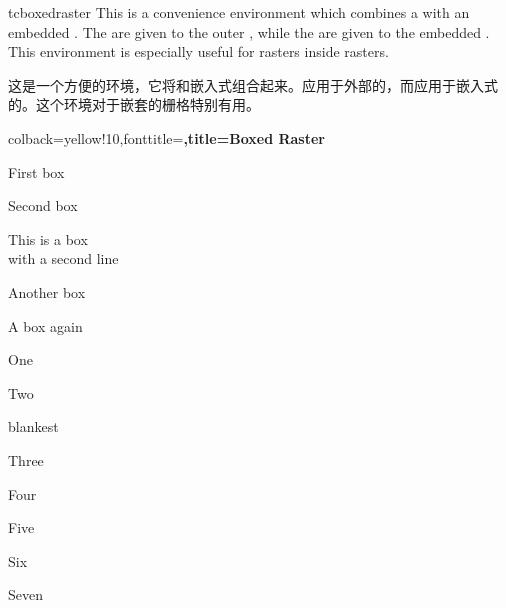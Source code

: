 \begin{docEnvironment}[doc new=2016-02-19]{tcboxedraster}{}
This is a convenience environment which combines a  with
an embedded . The  are given to the
outer , while the  are given to the
embedded .
This environment is especially useful for rasters inside rasters.

这是一个方便的环境，它将和嵌入式组合起来。应用于外部的，而应用于嵌入式的。这个环境对于嵌套的栅格特别有用。
\begin{dispExample}
\begin{tcboxedraster}[raster columns=3, raster equal height,
size=small,colframe=red!50!black,colback=red!10!white,colbacktitle=red!50!white,
title={Box \# \thetcbrasternum}]
{colback=yellow!10,fonttitle=\bfseries,title=Boxed Raster}
\begin{tcolorbox}First box\end{tcolorbox}
\begin{tcolorbox}Second box\end{tcolorbox}
\begin{tcolorbox}This is a box\\with a second line\end{tcolorbox}
\begin{tcolorbox}Another box\end{tcolorbox}
\begin{tcolorbox}A box again\end{tcolorbox}
\end{tcboxedraster}
\end{dispExample}

\begin{dispExample}
\begin{tcbraster}[raster columns=2, raster equal height,
raster every box/.style={size=small,colframe=red!50!black,colback=red!10!white,
valign=center,halign=center}]
\begin{tcolorbox}One\end{tcolorbox}
\begin{tcolorbox}Two\end{tcolorbox}
\begin{tcboxedraster}{blankest}
    \begin{tcolorbox}Three\end{tcolorbox}
    \begin{tcolorbox}Four\end{tcolorbox}
    \begin{tcolorbox}Five\end{tcolorbox}
    \begin{tcolorbox}Six\end{tcolorbox}
\end{tcboxedraster}
\begin{tcolorbox}Seven\end{tcolorbox}
\end{tcbraster}
\end{dispExample}
\end{docEnvironment}



